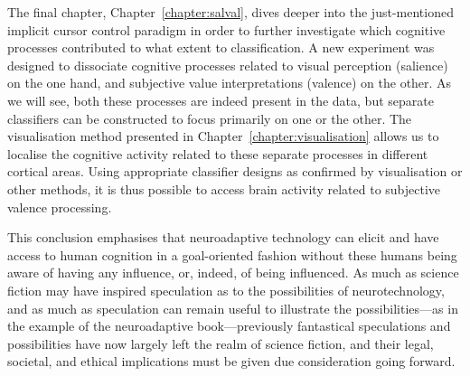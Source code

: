 The final chapter, Chapter~\ref{chapter:salval}, dives deeper into the just-mentioned implicit cursor control paradigm in order to further investigate which cognitive processes contributed to what extent to classification. A new experiment was designed to dissociate cognitive processes related to visual perception (salience) on the one hand, and subjective value interpretations (valence) on the other. As we will see, both these processes are indeed present in the data, but separate classifiers can be constructed to focus primarily on one or the other. The visualisation method presented in Chapter~\ref{chapter:visualisation} allows us to localise the cognitive activity related to these separate processes in different cortical areas. Using appropriate classifier designs as confirmed by visualisation or other methods, it is thus possible to access brain activity related to subjective valence processing.

This conclusion emphasises that neuroadaptive technology can elicit and have access to human cognition in a goal-oriented fashion without these humans being aware of having any influence, or, indeed, of being influenced. As much as science fiction may have inspired speculation as to the possibilities of neurotechnology, and as much as speculation can remain useful to illustrate the possibilities---as in the example of the neuroadaptive book---previously fantastical speculations and possibilities have now largely left the realm of science fiction, and their legal, societal, and ethical implications must be given due consideration going forward.
